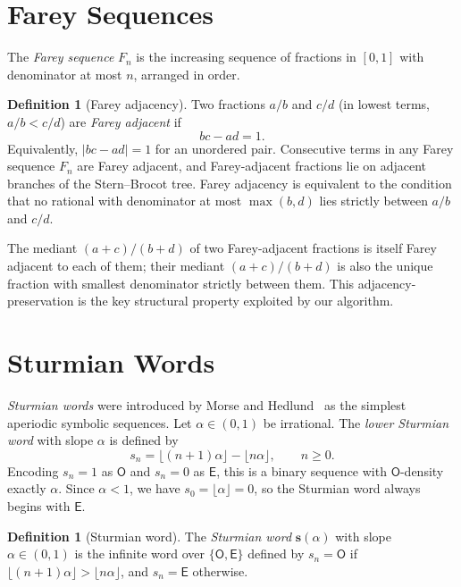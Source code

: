 \documentclass[12pt]{article}
\theoremstyle{definition}
\newtheorem{definition}[theorem]{Definition}
\theoremstyle{remark}
\theoremstyle{plain}
\newcommand{\OO}{\mathsf{O}}
\newcommand{\EE}{\mathsf{E}}
\begin{document}
\section{Farey Sequences}
\label{sec:background-farey}

The \emph{Farey sequence} $F_n$ is the increasing sequence of fractions in $[0,1]$
with denominator at most $n$, arranged in order.

\begin{definition}[Farey adjacency]
\label{def:farey-adjacency}
Two fractions $a/b$ and $c/d$ (in lowest terms, $a/b < c/d$) are
\emph{Farey adjacent} if
\[
  bc - ad = 1.
\]
Equivalently, $|bc - ad| = 1$ for an unordered pair.
Consecutive terms in any Farey sequence $F_n$ are Farey adjacent, and
Farey-adjacent fractions lie on adjacent branches of the Stern--Brocot tree.
Farey adjacency is equivalent to the condition that no rational with denominator
at most $\max(b, d)$ lies strictly between $a/b$ and $c/d$.
\end{definition}

The mediant $(a+c)/(b+d)$ of two Farey-adjacent fractions is itself Farey adjacent
to each of them; their mediant $(a+c)/(b+d)$ is also the unique fraction with
smallest denominator strictly between them.
This adjacency-preservation is the key structural property exploited by our algorithm.

\section{Sturmian Words}
\label{sec:background-sturmian}


\emph{Sturmian words} were introduced by Morse and Hedlund~\cite{morse1940} as
the simplest aperiodic symbolic sequences.
Let $\alpha \in (0,1)$ be irrational.
The \emph{lower Sturmian word} with slope $\alpha$ is defined by
\[
  s_n = \lfloor (n+1)\alpha \rfloor - \lfloor n\alpha \rfloor, \qquad n \geq 0.
\]
Encoding $s_n = 1$ as $\OO$ and $s_n = 0$ as $\EE$, this is a binary sequence
with $\OO$-density exactly $\alpha$.
Since $\alpha < 1$, we have $s_0 = \lfloor\alpha\rfloor = 0$, so the Sturmian word
always begins with $\EE$.

\begin{definition}[Sturmian word]
\label{def:sturmian}
The \emph{Sturmian word} $\mathbf{s}(\alpha)$ with slope $\alpha \in (0,1)$
is the infinite word over $\{\OO, \EE\}$ defined by
$s_n = \OO$ if $\lfloor(n+1)\alpha\rfloor > \lfloor n\alpha\rfloor$, and
$s_n = \EE$ otherwise.
\end{definition}
\end{document}
